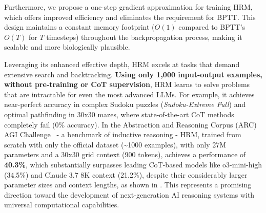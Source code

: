 Furthermore, we propose a one-step gradient approximation for training HRM, which offers improved efficiency and eliminates the requirement for BPTT. This design maintains a constant memory footprint ($O(1)$ compared to BPTT's $O(T)$ for $T$ timesteps) throughout the backpropagation process, making it scalable and more biologically plausible.

Leveraging its enhanced effective depth, HRM excels at tasks that demand extensive search and backtracking. \textbf{Using only 1,000 input-output examples, without pre-training or CoT supervision}, HRM learns to solve problems that are intractable for even the most advanced LLMs. For example, it achieves near-perfect accuracy in complex Sudoku puzzles (\textit{Sudoku-Extreme Full}) and optimal pathfinding in 30x30 mazes, where state-of-the-art CoT methods completely fail (0\% accuracy). In the Abstraction and Reasoning Corpus (ARC) AGI Challenge~\cite{AbstractionReasoning2019, Chollet2024ARCP2, Chollet2025ARCAGI2AN} - a benchmark of inductive reasoning - HRM, trained from scratch with only the official dataset (\textasciitilde1000 examples), with only 27M parameters and a 30x30 grid context (900 tokens), achieves a performance of \textbf{40.3\%}, which substantially surpasses leading CoT-based models like o3-mini-high (34.5\%) and Claude 3.7 8K context (21.2\%), despite their considerably larger parameter sizes and context lengths, as shown in . This represents a promising direction toward the development of next-generation AI reasoning systems with universal computational capabilities.

